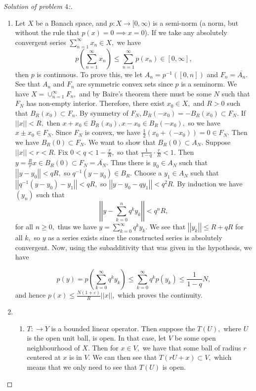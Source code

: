 \documentclass[letterpaper,11pt,twoside]{article}
\theoremstyle{proposition}
\theoremstyle{definition}
\theoremstyle{theorem}
\theoremstyle{definition}
\theoremstyle{definition}
\theoremstyle{definition}
\theoremstyle{lemma}
\theoremstyle{definition}
\theoremstyle{definition}
\theoremstyle{corollary}
\theoremstyle{definition}
\theoremstyle{definition}
\theoremstyle{definition}
\newcommand{\norm}[1]{\left \vert \left \vert #1 \right \vert \right \vert}
\begin{document}
\begin{proof}[Solution of problem $4$:]
 \begin{enumerate}
 	\item Let $X$ be a Banach space, and $p: X \to [0,\infty)$ is a semi-norm (a norm, but without the rule that $p(x)=0 \implies x=0$). If we take any 
 	absolutely convergent series $\sum_{n=1}^{\infty}x_n \in X,$ we have $$p\left( \sum_{n=1}^{\infty}x_n  \right) \leq \sum_{n=1}^{\infty}p(x_n)  \in [0, 
 	\infty],$$ then $p$ is continuous. To prove this, we let  $A_n= p^{-1}([0,n])$ and $F_n= \overline{A_n}.$ See that $A_n$ and $F_n$ are symmetric convex 
 	sets since $p$ is a seminorm. We have $X = \cup_{n=1}^{\infty} F_n,$ and by Baire's theorem there must be some $N$ such that $F_N$ has non-empty 
 	interior. Therefore, there exist $x_0 \in X,$ and $R>0$ such that $B_R(x_0) \subset F_n.$ By symmetry of $F_N, B_R(-x_0)= -B_R(x_0) \subset F_N.$ If 
 	$\norm{x} < R,$ then $x+x_0 \in B_R(x_0), x-x_0 \in B_R(-x_0),$ so we have $x \pm x_0 \in F_N.$ Since $F_N$ is convex, we have $\frac{1}{2}(x_0 + 
 	(-x_0)) =0 \in F_N.$ Then we have $B_R(0) \subset F_N.$ We want to show that $B_R(0) \subset A_N.$ Suppose $\norm{x} < r < R.$ Fix $0 < q < 1- 
 	\frac{r}{R},$ so that $ \frac{1}{1-q} \cdot \frac{r}{R} < 1.$ Then $y = \frac{R}{r}x \in B_R(0) \subset F_N = \overline{A_N}.$ Thus there is $y_0 \in 
 	A_N$ such that $\norm{y-y_0} < qR,$ so $q^{-1}(y-y_0) \in B_R.$ Choose a  $y_1 \in A_N$ such that $\norm{q^{-1}(y-y_0)-y_1} < qR,$ so 
 	$\norm{y-y_0-qy_1} < q^2R.$ By induction we have $(y_n)$ such that $$ \norm{y - \sum_{k=0}^{n}q^ky_k } < q^nR,$$ for all $n \geq 0,$  thus we have 
 	$y=\sum_{k=0}^{\infty} q^ky_k.$ We see that $\norm{y_k} \leq R+ qR$ for all $k,$ so $y$ as a series exists since the constructed series is absolutely 
 	convergent. Now, using the subadditivity that was given in the hypothesis, we have 
 	
 	$$p(y) = p \left( \sum_{k=0}^{\infty} q^ky_k \right) \leq \sum_{k=0}^{\infty} q^kp(y_k) \leq \frac{1}{1-q}N, $$
 	and hence $p(x) \leq \frac{N(1+ \varepsilon)}{R}\norm{x},$ which proves the continuity. 
 	
 	\item \begin{enumerate}
 		\item 	$T: \to Y$ is a bounded linear operator. Then suppose the $T(U),$ where $U$ is the open unit ball, is open. In that case, let $V$ be some 
 		open 
 		neighbourhood of $X.$ Then for $x \in V,$ we have that some ball of radius $r $ centered at $x$ is in $V.$ We can then see that $T(rU+x) \subset V,$ 
 		which means that we only need to see that $T(U)$ is open. 
 		

\end{enumerate}
\end{enumerate}
\end{proof}
\end{document}
